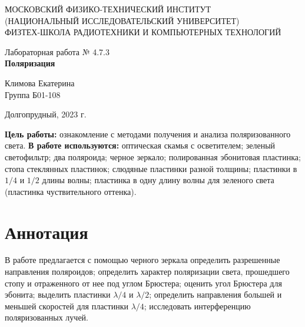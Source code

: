 \documentclass[a4paper,12pt]{article} %
\begin{document}
\begin{center}
	\footnotesize{МОСКОВСКИЙ ФИЗИКО-ТЕХНИЧЕСКИЙ ИНСТИТУТ\\(НАЦИОНАЛЬНЫЙ 			ИССЛЕДОВАТЕЛЬСКИЙ УНИВЕРСИТЕТ)}\\
	\footnotesize{ФИЗТЕХ-ШКОЛА РАДИОТЕХНИКИ И КОМПЬЮТЕРНЫХ ТЕХНОЛОГИЙ\\}
	\hfill \break
	\hfill \break
	\hfill \break
	\hfill \break
	\hfill \break
	\hfill \break
\end{center}

\begin{center}   
    \hfill \break
	\hfill \break
	\hfill \break
	\hfill \break
	\hfill \break
	\hfill \break
	\hfill \break
	\hfill \break
	\hfill \break
	\hfill \break
	\hfill \break
	\large{Лабораторная работа № 4.7.3\\\large{\textbf{Поляризация}}}\\
	\hfill \break
        \hfill \break
	\hfill \break
	\hfill \break
	\hfill \break
	\hfill \break
	\hfill \break
	\hfill \break
	\hfill \break
	\hfill \break
	\hfill \break
	\begin{flushright}
		Климова Екатерина\\
		Группа Б01-108
	\end{flushright}
	\hfill \break
\end{center}
\hfill \break
\hfill \break
\begin{center}
	Долгопрудный, 2023 г.
\end{center}
\thispagestyle{empty}

\newpage
\hfill \break
\textbf{Цель работы:} ознакомление с методами получения и анализа поляризованного света.
\hfill \break
\hfill \break
\textbf{В работе используются:} оптическая скамья с осветителем; зеленый светофильтр; два поляроида; черное зеркало; полированная эбонитовая пластинка; стопа стеклянных пластинок; слюдяные пластинки разной толщины; пластинки в $1/4$ и $1/2$ длины волны; пластинка в одну длину волны для зеленого света (пластинка чуствительного оттенка).

\section{Аннотация}
\hfill \break В работе предлагается с помощью черного зеркала определить разрешенные направления поляроидов; определить характер поляризации света, прошедшего стопу и отраженного от нее под углом Брюстера; оценить угол Брюстера для эбонита; выделить пластинки $\lambda/4$ и $\lambda/2$; определить направления большей и меньшей скоростей для пластинки $\lambda/4$; исследовать интерференцию поляризованных лучей.
\end{document}
